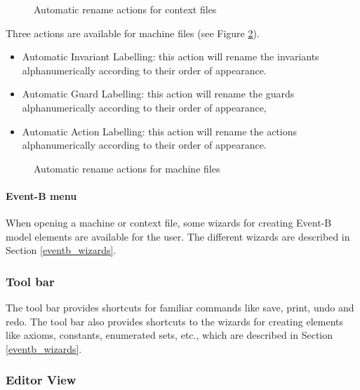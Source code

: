 \begin{figure}[ht]
\begin{center}
	\caption{Automatic rename actions for context files}
	\label{fig_ref_01_menubar2}
\end{center}
\end{figure}

Three actions are available for machine files (see Figure \ref{fig_ref_01_menubar1}).

    \begin{itemize}
    	\item Automatic Invariant Labelling: this action will rename the invariants alphanumerically according to their order of appearance.
	\item Automatic Guard Labelling: this action will rename the guards alphanumerically according to their order of appearance,
	\item Automatic Action Labelling: this action will rename the actions alphanumerically according to their order of appearance. 
    \end{itemize}

\begin{figure}[ht]
\begin{center}
	\caption{Automatic rename actions for machine files}
	\label{fig_ref_01_menubar1}
\end{center}
\end{figure}

\paragraph{Event-B menu}

When opening a machine or context file, some wizards for creating Event-B model elements are available for the user. The different wizards are described in Section \ref{eventb_wizards}.

\subsubsection{Tool bar}
\label{tool_bar}

The tool bar provides shortcuts for familiar commands like save, print, undo and redo. The tool bar also provides shortcuts to the wizards for creating elements like axioms, constants, enumerated sets, etc., which are described in Section \ref{eventb_wizards}.

\subsubsection{Editor View}
\label{editor_view}

